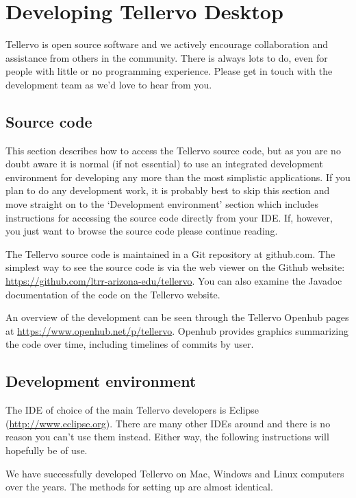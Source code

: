 \chapter{Developing Tellervo Desktop}
\label{txt:devDesktop}
Tellervo is open source software and we actively encourage collaboration and assistance from others in the community.  There is always lots to do, even for people with little or no programming experience.  Please get in touch with the development team as we'd love to hear from you.

\section{Source code}
This section describes how to access the Tellervo source code, but as you are no doubt aware it is normal (if not essential) to use an integrated development environment for developing any more than the most simplistic applications.  If you plan to do any development work, it is probably best to skip this section and move straight on to the `Development environment' section which includes instructions for accessing the source code directly from your IDE.  If, however, you just want to browse the source code please continue reading.

The Tellervo source code is maintained in a Git repository at github.com.  The simplest way to see the source code is via the web viewer on the Github website: \url{https://github.com/ltrr-arizona-edu/tellervo}.  You can also examine the Javadoc documentation of the code on the Tellervo website.

An overview of the development can be seen through the Tellervo Openhub pages at \url{https://www.openhub.net/p/tellervo}.  Openhub provides graphics summarizing the code over time, including timelines of commits by user.



\section{Development environment}
The IDE of choice of the main Tellervo developers is Eclipse (\url{http://www.eclipse.org}). There are many other IDEs around and there is no reason you can't use them instead.  Either way, the following instructions will hopefully be of use.

We have successfully developed Tellervo on Mac, Windows and Linux computers over the years.  The methods for setting up are almost identical.  

